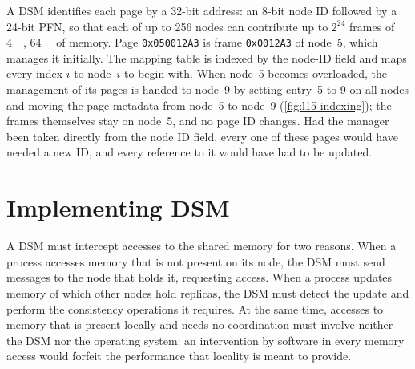 \documentclass[../main.tex]{subfiles}
\begin{document}
\begin{example}
  A DSM identifies each page by a 32-bit address: an 8-bit node ID followed
  by a 24-bit PFN, so that each of up to 256 nodes can contribute up to
  $2^{24}$ frames of \SI{4}{\kibi\byte}, \SI{64}{\gibi\byte} of memory.
  Page \texttt{0x050012A3} is frame \texttt{0x0012A3} of node~5, which
  manages it initially.  The mapping table is indexed by the node-ID field
  and maps every index $i$ to node~$i$ to begin with.  When node~5 becomes
  overloaded, the management of its pages is handed to node~9 by setting
  entry~5 to 9 on all nodes and moving the page metadata from node~5 to
  node~9 (\cref{fig:l15-indexing}); the frames themselves stay on node~5,
  and no page ID changes.  Had the manager been taken directly from the
  node ID field, every one of these pages would have needed a new ID, and
  every reference to it would have had to be updated.
\end{example}

\section{Implementing DSM}
\label{sec:l15-implementing}

A DSM must intercept accesses to the shared memory for two
reasons.  When a process accesses memory that is not present on its node, the DSM
must send messages to the node that holds it, requesting access.  When a
process updates memory of which other nodes hold replicas, the DSM must
detect the update and perform the consistency operations it requires.  At
the same time, accesses to memory that is present locally and needs no
coordination must involve neither the DSM nor the operating system: an
intervention by software in every memory access would forfeit the
performance that locality is meant to provide.
\end{document}
